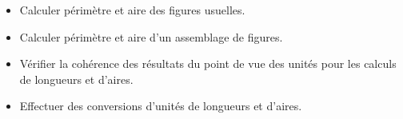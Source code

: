 \begin{prerequis}[Objectifs de 5\up{e}]  
    \begin{itemize}  
        \item Calculer périmètre et aire des figures usuelles.
        \item Calculer périmètre et aire d’un assemblage de figures.
        \columnbreak
        \item Vérifier la cohérence des résultats du point de vue des unités pour les calculs de longueurs et d’aires.
        \item Effectuer des conversions d’unités de longueurs et d’aires.
    \end{itemize}
\end{prerequis}
